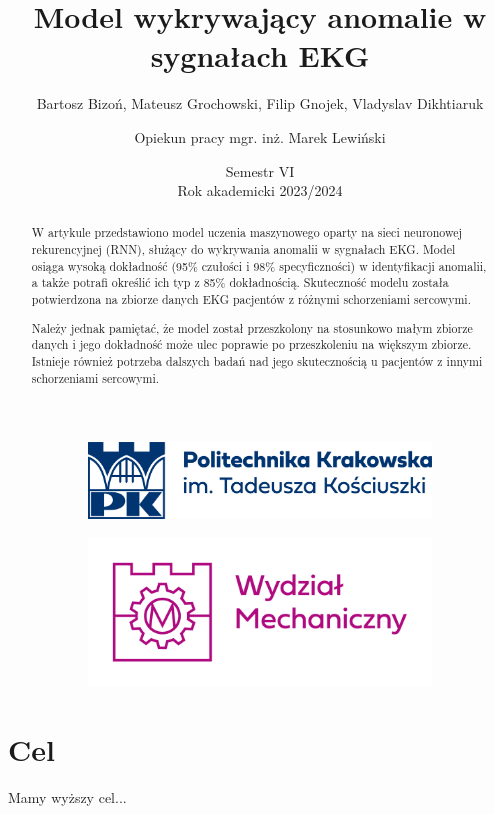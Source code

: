 \documentclass[12pt,a4paper]{article}
\title{\huge{Model wykrywający anomalie w sygnałach EKG } }
\author{Bartosz Bizoń, Mateusz Grochowski, Filip Gnojek, Vladyslav Dikhtiaruk
\and \small{Opiekun pracy mgr. inż. Marek Lewiński}}
\date{Semestr VI \\ Rok akademicki 2023/2024}
\begin{document}
\begin{figure}
    \begin{subfigure}{.49\textwidth}
      \includegraphics[width=.7\linewidth]{images/PK_POZIOM_RGB.png}
      \centering
    \end{subfigure}
    \begin{subfigure}{.49\textwidth}
      \includegraphics[width=.6\linewidth]{WM_RGB.png}
      \centering
    \end{subfigure}
\end{figure}
\maketitle


\begin{abstract}
W artykule przedstawiono model uczenia maszynowego oparty na sieci neuronowej rekurencyjnej (RNN), służący do wykrywania anomalii w sygnałach EKG. Model osiąga wysoką dokładność (95\% czułości i 98\% specyficzności) w identyfikacji anomalii, a także potrafi określić ich typ z 85\% dokładnością. Skuteczność modelu została potwierdzona na zbiorze danych EKG pacjentów z różnymi schorzeniami sercowymi.

Należy jednak pamiętać, że model został przeszkolony na stosunkowo małym zbiorze danych i jego dokładność może ulec poprawie po przeszkoleniu na większym zbiorze. Istnieje również potrzeba dalszych badań nad jego skutecznością u pacjentów z innymi schorzeniami sercowymi.
\end{abstract}

\newpage

\tableofcontents

\newpage
\section{Cel}
Mamy wyższy cel...
\end{document}
